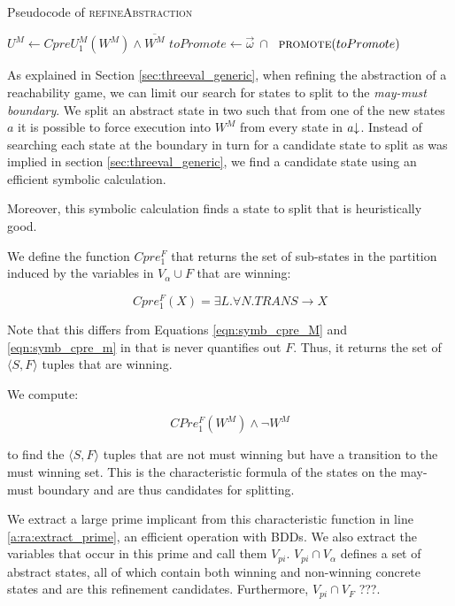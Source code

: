 \begin{algorithm}

\caption{Pseudocode of \textsc{refineAbstraction}}
\label{alg:refineAbstraction}

\begin{algorithmic}[1]
    \State $U^M \gets CpreU_1^M(W^M) \land \overline{W^M}$
    \State $toPromote \gets \vec{\omega}~\cap~$ \label{a:ra:extract_prime}
    \State $\Call{promote}{toPromote}$
\EndFunction
\end{algorithmic}
\end{algorithm}

As explained in Section \ref{sec:threeval_generic}, when refining the abstraction of a reachability game, we can limit our search for states to split to the \emph{may-must boundary}. We split an abstract state in two such that from one of the new states $a$ it is possible to force execution into $W^M$ from every state in $a\mathord{\downarrow}$. Instead of searching each state at the boundary in turn for a candidate state to split as was implied in section \ref{sec:threeval_generic}, we find a candidate state using an efficient symbolic calculation.

Moreover, this symbolic calculation finds a state to split that is heuristically good.

We define the function $Cpre_1^F$ that returns the set of sub-states in the partition induced by the variables in $V_{\alpha} \cup F$ that are winning:

\begin{equation}
    Cpre_1^F(X) = \exists L. \forall N. TRANS \rightarrow X
\end{equation}

Note that this differs from Equations \ref{eqn:symb_cpre_M} and \ref{eqn:symb_cpre_m} in that is never quantifies out $F$. Thus, it returns the set of $\langle S, F \rangle$ tuples that are winning.

We compute:

\begin{equation}
    CPre_1^F(W^M) \wedge \neg W^M
\end{equation}

\noindent to find the $\langle S, F \rangle$ tuples that are not must winning but have a transition to the must winning set. This is the characteristic formula of the states on the may-must boundary and are thus candidates for splitting.

We extract a large prime implicant from this characteristic function in line \ref{a:ra:extract_prime}, an efficient operation with BDDs. We also extract the variables that occur in this prime and call them $V_{pi}$. $V_{pi} \cap V_{\alpha}$ defines a set of abstract states, all of which contain both winning and non-winning concrete states and are this refinement candidates. Furthermore, $V_{pi} \cap V_F$ ???.

